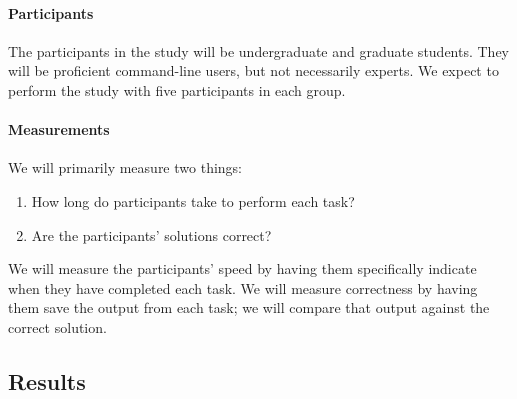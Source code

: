 \paragraph{Participants} The participants in the study will be undergraduate and
graduate students. They will be proficient command-line users, but not
necessarily experts. We expect to perform the study with five participants in
each group.

\paragraph{Measurements} We will primarily measure two things:
\begin{enumerate}\itemsep-1pt
    \item How long do participants take to perform each task?
    \item Are the participants' solutions correct?
\end{enumerate}
We will measure the participants' speed by having them specifically indicate
when they have completed each task. We will measure correctness by having them
save the output from each task; we will compare that output against the correct
solution.

\subsection{Results}

